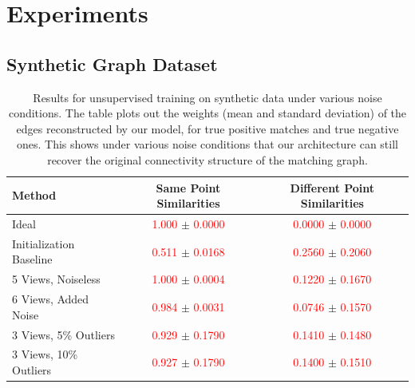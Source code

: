 \documentclass{article} %
\begin{document}
\section{Experiments}

\subsection{Synthetic Graph Dataset}

\begin{table}[t]
\begin{center}
\begin{tabular}{|l|c|c|}
\hline
Method & Same Point Similarities & Different Point Similarities  \\
\hline\hline\hline
Ideal                              & \textcolor{red}{1.000} $\pm$ \textcolor{red}{0.0000} & \textcolor{red}{0.0000} $\pm$ \textcolor{red}{0.0000} \\ \hline
Initialization Baseline            & \textcolor{red}{0.511} $\pm$ \textcolor{red}{0.0168} & \textcolor{red}{0.2560} $\pm$ \textcolor{red}{0.2060} \\ \hline
5 Views, Noiseless                 & \textcolor{red}{1.000} $\pm$ \textcolor{red}{0.0004} & \textcolor{red}{0.1220} $\pm$ \textcolor{red}{0.1670} \\ \hline
6 Views, Added Noise               & \textcolor{red}{0.984} $\pm$ \textcolor{red}{0.0031} & \textcolor{red}{0.0746} $\pm$ \textcolor{red}{0.1570} \\ \hline
3 Views, 5\% Outliers              & \textcolor{red}{0.929} $\pm$ \textcolor{red}{0.1790} & \textcolor{red}{0.1410} $\pm$ \textcolor{red}{0.1480} \\ 
3 Views, 10\% Outliers             & \textcolor{red}{0.927} $\pm$ \textcolor{red}{0.1790} & \textcolor{red}{0.1400} $\pm$ \textcolor{red}{0.1510} \\ \hline

\hline
\end{tabular}
\end{center}
\caption{
Results for unsupervised training on synthetic data under various noise conditions.
The table plots out the weights (mean and standard deviation) of the edges reconstructed by our model, for true positive matches and true negative ones.
This shows under various noise conditions that our architecture can still recover the original connectivity structure of the matching graph.
}
\label{fig:synthtable}
\end{table}
\end{document}
